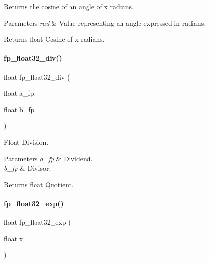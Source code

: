 Returns the cosine of an angle of x radians. 


\begin{DoxyParams}{Parameters}
{\em rad} & Value representing an angle expressed in radians. \\
\hline
\end{DoxyParams}
\begin{DoxyReturn}{Returns}
float Cosine of x radians. 
\end{DoxyReturn}
\mbox{\label{a00023_a02a02cf636799092e56f66a57d90d91b}} 
\paragraph{\texorpdfstring{fp\+\_\+float32\+\_\+div()}{fp\_float32\_div()}}
{\footnotesize\ttfamily float fp\+\_\+float32\+\_\+div (\begin{DoxyParamCaption}\item[{float}]{a\+\_\+fp,  }\item[{float}]{b\+\_\+fp }\end{DoxyParamCaption})}



Float Division. 


\begin{DoxyParams}{Parameters}
{\em a\+\_\+fp} & Dividend. \\
\hline
{\em b\+\_\+fp} & Divisor. \\
\hline
\end{DoxyParams}
\begin{DoxyReturn}{Returns}
float Quotient. 
\end{DoxyReturn}
\mbox{\label{a00023_a595d6a7d9a0a116f0db5bd4cfdbcd166}} 
\paragraph{\texorpdfstring{fp\+\_\+float32\+\_\+exp()}{fp\_float32\_exp()}}
{\footnotesize\ttfamily float fp\+\_\+float32\+\_\+exp (\begin{DoxyParamCaption}\item[{float}]{x }\end{DoxyParamCaption})}



